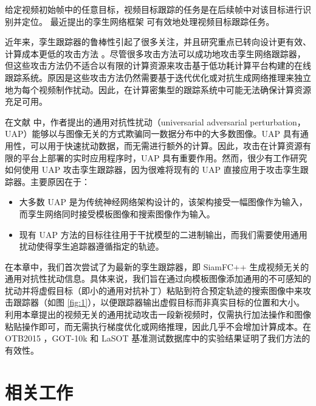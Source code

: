 给定视频初始帧中的任意目标，视频目标跟踪的任务是在后续帧中对该目标进行识别并定位。
最近提出的孪生网络框架 \cite{SiamFC,SiamRPN,SiamRPN++,SiamFC++} 可有效地处理视频目标跟踪任务。

近年来，孪生跟踪器的鲁棒性引起了很多关注，并且研究重点已转向设计更有效、计算成本更低的攻击方法 \cite{TTP,FAN,SPARK}。尽管很多攻击方法可以成功地攻击孪生网络跟踪器，但这些攻击方法仍不适合以有限的计算资源来攻击基于低功耗计算平台构建的在线跟踪系统。原因是这些攻击方法仍然需要基于迭代优化或对抗生成网络推理来独立地为每个视频制作扰动。因此，在计算密集型的跟踪系统中可能无法确保计算资源充足可用。

在文献 \cite{UAP} 中，作者提出的通用对抗性扰动（universarial adversarial perturbation，UAP）能够以与图像无关的方式欺骗同一数据分布中的大多数图像。UAP 具有通用性，可以用于快速扰动数据，而无需进行额外的计算。因此，攻击在计算资源有限的平台上部署的实时应用程序时，UAP 具有重要作用。然而，很少有工作研究如何使用 UAP 攻击孪生跟踪器，因为很难将现有的 UAP 直接应用于攻击孪生跟踪器。主要原因在于：
\begin{itemize}
\item 大多数 UAP 是为传统神经网络架构设计的，该架构接受一幅图像作为输入，而孪生网络同时接受模板图像和搜索图像作为输入。
\item 现有 UAP 方法的目标往往用于干扰模型的二进制输出，而我们需要使用通用扰动使得孪生追踪器遵循指定的轨迹。
\end{itemize}

在本章中，我们首次尝试了为最新的孪生跟踪器，即 SiamFC++ \cite{SiamFC++} 生成视频无关的通用对抗性扰动信息。具体来说，我们旨在通过向模板图像添加通用的不可感知的扰动并将虚假目标（即小的通用对抗补丁）粘贴到符合预定轨迹的搜索图像中来攻击跟踪器（如图 \ref{fig:1}），以便跟踪器输出虚假目标而非真实目标的位置和大小。利用本章提出的视频无关的通用扰动攻击一段新视频时，仅需执行加法操作和图像粘贴操作即可，而无需执行梯度优化或网络推理，因此几乎不会增加计算成本。在 OTB2015 \cite{OTB}，GOT-10k \cite{GOT-10k} 和 LaSOT \cite{LaSOT} 基准测试数据库中的实验结果证明了我们方法的有效性。
\section{相关工作}

